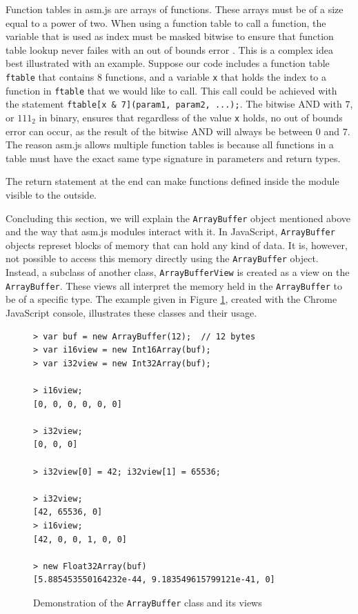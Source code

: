 \documentclass[11pt]{report}
\begin{document}
Function tables in asm.js are arrays of functions. These arrays must be of a size equal to a power of two. When using a function table to call a function, the variable that is used as index must be masked bitwise to ensure that function table lookup never failes with an out of bounds error \cite{asmjspdf}. This is a complex idea best illustrated with an example. Suppose our code includes a function table \texttt{ftable} that contains $8$ functions, and a variable \texttt{x} that holds the index to a function in \texttt{ftable} that we would like to call. This call could be achieved with the statement \texttt{ftable[x \& 7](param1, param2, ...);}. The bitwise AND with $7$, or $111_2$ in binary, ensures that regardless of the value \texttt{x} holds, no out of bounds error can occur, as the result of the bitwise AND will always be between 0 and 7. The reason asm.js allows multiple function tables is because all functions in a table must have the exact same type signature in parameters and return types.

The return statement at the end can make functions defined inside the module visible to the outside.

Concluding this section, we will explain the \texttt{ArrayBuffer} object mentioned above and the way that asm.js modules interact with it. In JavaScript, \texttt{ArrayBuffer} objects represet blocks of memory that can hold any kind of data. It is, however, not possible to access this memory directly using the \texttt{ArrayBuffer} object. Instead, a subclass of another class, \texttt{ArrayBufferView} is created as a view on the \texttt{ArrayBuffer}. These views all interpret the memory held in the \texttt{ArrayBuffer} to be of a specific type. The example given in Figure \ref{arraybufferexample}, created with the Chrome JavaScript console, illustrates these classes and their usage.

\begin{figure}[ht]
\begin{lstlisting}
> var buf = new ArrayBuffer(12);  // 12 bytes
> var i16view = new Int16Array(buf);
> var i32view = new Int32Array(buf);

> i16view;
[0, 0, 0, 0, 0, 0]

> i32view;
[0, 0, 0]

> i32view[0] = 42; i32view[1] = 65536;

> i32view;
[42, 65536, 0]
> i16view;
[42, 0, 0, 1, 0, 0]

> new Float32Array(buf)
[5.885453550164232e-44, 9.183549615799121e-41, 0]
\end{lstlisting}
\caption{Demonstration of the \texttt{ArrayBuffer} class and its views}
\label{arraybufferexample}
\end{figure}
\end{document}
